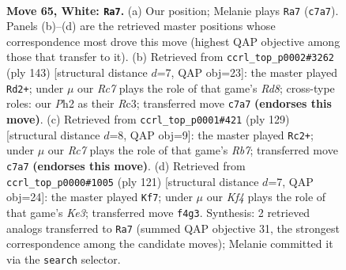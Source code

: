 \documentclass[11pt]{article}
\begin{document}
\clearpage

\begin{figure}[p]\centering
\begin{subfigure}{0.46\textwidth}\centering
\resizebox{\linewidth}{!}{%
\newchessgame
\chessboard[
  setfen={8/2R5/7k/pr6/5K2/1P6/7P/3r4 w - - 4 65},
  showmover=false,
  pgfstyle=straightmove, color=movearrow, markmove={c7-a7}
]}
\caption{}
\end{subfigure}\hfill
\begin{subfigure}{0.46\textwidth}\centering
\resizebox{\linewidth}{!}{%
\newchessgame
\chessboard[
  setfen={1R6/8/6pk/8/6RP/2r5/7K/3r4 b - - 10 72},
  showmover=false,
  pgfstyle=straightmove, color=movearrow, markmove={d1-d2}
]}
\caption{}
\end{subfigure}
\\[4pt]
\begin{subfigure}{0.46\textwidth}\centering
\resizebox{\linewidth}{!}{%
\newchessgame
\chessboard[
  setfen={4k3/8/2K5/P7/8/R5p1/1r6/8 b - - 12 65},
  showmover=false,
  pgfstyle=straightmove, color=movearrow, markmove={b2-c2}
]}
\caption{}
\end{subfigure}\hfill
\begin{subfigure}{0.46\textwidth}\centering
\resizebox{\linewidth}{!}{%
\newchessgame
\chessboard[
  setfen={8/6p1/4k3/6RP/5r2/8/2K5/8 b - - 0 61},
  showmover=false,
  pgfstyle=straightmove, color=movearrow, markmove={e6-f7}
]}
\caption{}
\end{subfigure}
\caption{\textbf{Move 65, White: \texttt{Ra7}.} (a) Our position; Melanie plays \texttt{Ra7} (\texttt{c7a7}). Panels (b)--(d) are the retrieved master positions whose correspondence most drove this move (highest QAP objective among those that transfer to it). (b) Retrieved from \texttt{ccrl\_top\_p0002\#3262} (ply 143) [structural distance $d$=7, QAP obj=23]: the master played \texttt{Rd2+}; under $\mu$ our \emph{Rc7} plays the role of that game's \emph{Rd8}; cross-type roles: our \emph{P}h2 as their \emph{R}c3; transferred move \texttt{c7a7} \textbf{(endorses this move)}. (c) Retrieved from \texttt{ccrl\_top\_p0001\#421} (ply 129) [structural distance $d$=8, QAP obj=9]: the master played \texttt{Rc2+}; under $\mu$ our \emph{Rc7} plays the role of that game's \emph{Rb7}; transferred move \texttt{c7a7} \textbf{(endorses this move)}. (d) Retrieved from \texttt{ccrl\_top\_p0000\#1005} (ply 121) [structural distance $d$=7, QAP obj=24]: the master played \texttt{Kf7}; under $\mu$ our \emph{Kf4} plays the role of that game's \emph{Ke3}; transferred move \texttt{f4g3}. Synthesis: 2 retrieved analogs transferred to \texttt{Ra7} (summed QAP objective 31, the strongest correspondence among the candidate moves); Melanie committed it via the \texttt{search} selector.}
\label{fig:thought-m128}
\end{figure}
\end{document}
